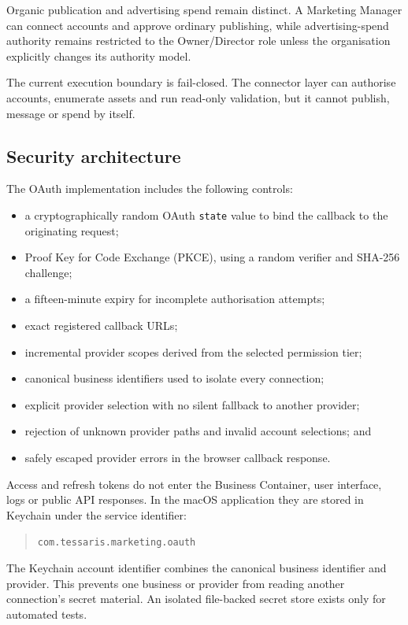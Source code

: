 Organic publication and advertising spend remain distinct. A Marketing Manager can connect accounts and approve ordinary publishing, while advertising-spend authority remains restricted to the Owner/Director role unless the organisation explicitly changes its authority model.

The current execution boundary is fail-closed. The connector layer can authorise accounts, enumerate assets and run read-only validation, but it cannot publish, message or spend by itself.

\subsection{Security architecture}

The OAuth implementation includes the following controls:

\begin{itemize}
    \item a cryptographically random OAuth \texttt{state} value to bind the callback to the originating request;
    \item Proof Key for Code Exchange (PKCE), using a random verifier and SHA-256 challenge;
    \item a fifteen-minute expiry for incomplete authorisation attempts;
    \item exact registered callback URLs;
    \item incremental provider scopes derived from the selected permission tier;
    \item canonical business identifiers used to isolate every connection;
    \item explicit provider selection with no silent fallback to another provider;
    \item rejection of unknown provider paths and invalid account selections; and
    \item safely escaped provider errors in the browser callback response.
\end{itemize}

Access and refresh tokens do not enter the Business Container, user interface, logs or public API responses. In the macOS application they are stored in Keychain under the service identifier:

\begin{quote}
\texttt{com.tessaris.marketing.oauth}
\end{quote}

The Keychain account identifier combines the canonical business identifier and provider. This prevents one business or provider from reading another connection's secret material. An isolated file-backed secret store exists only for automated tests.

